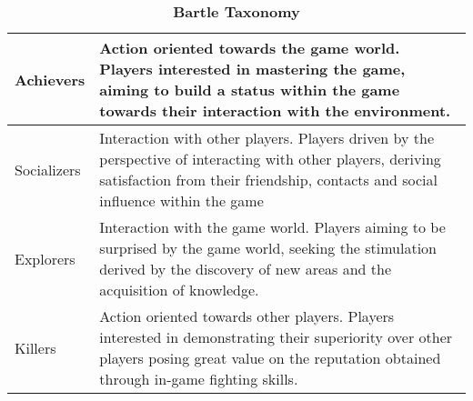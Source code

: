 \begin{table}[h]
\caption{\textbf{Bartle Taxonomy}}
\label{bartle}
\begin{tabularx}{\textwidth}{|l|X|}
\hline
Achievers   & Action oriented towards the game world. Players interested in mastering the game, aiming to build a status within the game towards their interaction with the environment.                      \\ \hline
Socializers & Interaction with other players. Players driven by the perspective of interacting with other players, deriving satisfaction from their friendship, contacts and social influence within the game \\ \hline
Explorers   & Interaction with the game world. Players aiming to be surprised by the game world, seeking the stimulation derived by the discovery of new areas and the acquisition of knowledge.              \\ \hline
Killers     & Action oriented towards other players. Players interested in demonstrating their superiority over other players posing great value on the reputation obtained through in-game fighting skills.  \\ \hline
\end{tabularx}
\end{table}